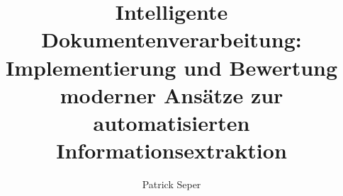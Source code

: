 \documentclass[bachelor,german,smartquotes,apa]{hgbthesis}
\begin{document}


\title{Intelligente Dokumentenverarbeitung: Implementierung und Bewertung moderner Ansätze zur automatisierten Informationsextraktion}
\author{Patrick Seper}





\frontmatter                                       %

\maketitle
\tableofcontents

		
			

\mainmatter                             %










\appendix                                                               %
\end{document}
